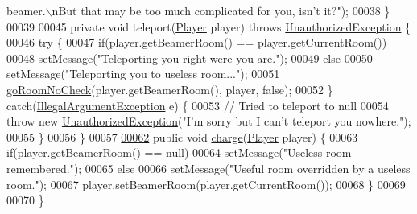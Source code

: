 \begin{DoxyCode}
{       beamer.\(\backslash\)nBut that may be too much complicated for you, isn't it?"});
00038     \}
00039 
00045     \textcolor{keyword}{private} \textcolor{keywordtype}{void} teleport(\hyperlink{classPlayer}{Player} player) \textcolor{keywordflow}{throws} \hyperlink{classUnauthorizedException}{UnauthorizedException} \{
00046         \textcolor{keywordflow}{try} \{
00047             \textcolor{keywordflow}{if}(player.getBeamerRoom() == player.getCurrentRoom())
00048                 setMessage(\textcolor{stringliteral}{"Teleporting you right were you are."});
00049             \textcolor{keywordflow}{else}
00050                 setMessage(\textcolor{stringliteral}{"Teleporting you to useless room..."});
00051             \hyperlink{classGoCommand_a3149bf695c19b78c39cfc4dadece7846}{goRoomNoCheck}(player.getBeamerRoom(), player, \textcolor{keyword}{false});
00052         \} \textcolor{keywordflow}{catch}(\hyperlink{classIllegalArgumentException}{IllegalArgumentException} e) \{
00053             \textcolor{comment}{// Tried to teleport to null}
00054             \textcolor{keywordflow}{throw} \textcolor{keyword}{new} \hyperlink{classUnauthorizedException}{UnauthorizedException}(\textcolor{stringliteral}{"I'm sorry but I can't teleport you
       nowhere."});
00055         \}
00056     \}
00057 
\hypertarget{BeamerCommand_8java_source_l00062}{}\hyperlink{classBeamerCommand_a130a572b2ec0532c92ea5033a098b1ac}{00062}     \textcolor{keyword}{public} \textcolor{keywordtype}{void} \hyperlink{classBeamerCommand_a130a572b2ec0532c92ea5033a098b1ac}{charge}(\hyperlink{classPlayer}{Player} player) \{
00063         \textcolor{keywordflow}{if}(player.\hyperlink{classPlayer_a9114998742351bf793e093cb198993ca}{getBeamerRoom}() == null)
00064             setMessage(\textcolor{stringliteral}{"Useless room remembered."});
00065         \textcolor{keywordflow}{else}
00066             setMessage(\textcolor{stringliteral}{"Useful room overridden by a useless room."});
00067         player.setBeamerRoom(player.getCurrentRoom());
00068     \}
00069 
00070 \}
\end{DoxyCode}
